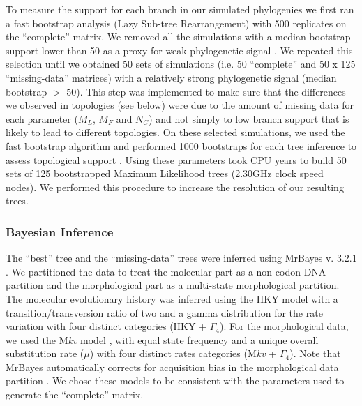 To measure the support for each branch in our simulated phylogenies we first ran a fast bootstrap analysis (Lazy Sub-tree Rearrangement) with 500 replicates on the ``complete'' matrix.
We removed all the simulations with a median bootstrap support lower than 50 as a proxy for weak phylogenetic signal \citep{zanderminimal2004}.
We repeated this selection until we obtained 50 sets of simulations (i.e. 50 ``complete'' and 50 x 125 ``missing-data'' matrices) with a relatively strong phylogenetic signal (median bootstrap $>$ 50).
This step was implemented to make sure that the differences we observed in topologies (see below) were due to the amount of missing data for each parameter ($M_L$, $M_F$ and $N_C$) and not simply to low branch support that is likely to lead to different topologies.
On these selected simulations, we used the fast bootstrap algorithm and performed 1000 bootstraps for each tree inference to assess topological support \citep{pattengale2010many}.
Using these parameters took  CPU years to build 50 sets of 125 bootstrapped Maximum Likelihood trees (2.30GHz clock speed nodes). We performed this procedure to increase the resolution of our resulting trees. 

\subsubsection*{Bayesian Inference}
The ``best'' tree and the ``missing-data'' trees were inferred using MrBayes v. 3.2.1 \citep{Ronquist2012mrbayes}.
We partitioned the data to treat the molecular part as a non-codon DNA partition and the morphological part as a multi-state morphological partition.
The molecular evolutionary history was inferred using the HKY model with a transition/transversion ratio of two \citep{douadycomparison2003} and a gamma distribution for the rate variation with four distinct categories (HKY + $\Gamma_4$).
For the morphological data, we used the M\textit{kv} model \citep{lewisa2001}, with equal state frequency and a unique overall substitution rate ($\mu$) with four distinct rates categories (M\textit{kv} + $\Gamma_4$).
Note that MrBayes automatically corrects for acquisition bias in the morphological data partition \citep{Nylander01022004,Ronquist2012mrbayes}.
We chose these models to be consistent with the parameters used to generate the ``complete'' matrix.

